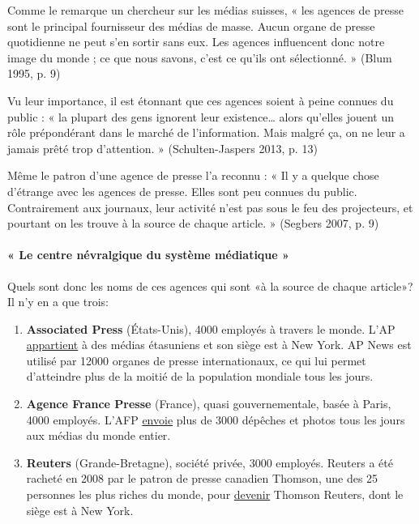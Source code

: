 Comme le remarque un chercheur sur les médias suisses, « les agences de
presse sont le principal fournisseur des médias de masse. Aucun organe
de presse quotidienne ne peut s'en sortir sans eux. Les agences
influencent donc notre image du monde ; ce que nous savons, c'est ce
qu'ils ont sélectionné. » (Blum 1995, p. 9)

Vu leur importance, il est étonnant que ces agences soient à peine
connues du public : « la plupart des gens ignorent leur
existence\ldots{} alors qu'elles jouent un rôle prépondérant dans le
marché de l'information. Mais malgré ça, on ne leur a jamais prêté trop
d'attention. » (Schulten-Jaspers 2013, p. 13)

Même le patron d'une agence de presse l'a reconnu : « Il y a quelque
chose d'étrange avec les agences de presse. Elles sont peu connues du
public. Contrairement aux journaux, leur activité n'est pas sous le feu
des projecteurs, et pourtant on les trouve à la source de chaque
article. » (Segbers 2007, p. 9)

\hypertarget{-le-centre-nuxe9vralgique-du-systuxe8me-muxe9diatique-}{%
\paragraph{« Le centre névralgique du système médiatique
»}\label{-le-centre-nuxe9vralgique-du-systuxe8me-muxe9diatique-}}

Quels sont donc les noms de ces agences qui sont «à la source de chaque
article»? Il n'y en a que trois:

\begin{enumerate}
\def\labelenumi{\arabic{enumi}.}
\tightlist
\item
  \textbf{Associated Press} (États-Unis), 4000 employés à travers le
  monde. L'AP
  \href{https://en.wikipedia.org/wiki/Associated_Press}{appartient} à
  des médias étasuniens et son siège est à New York. AP News est utilisé
  par 12000 organes de presse internationaux, ce qui lui permet
  d'atteindre plus de la moitié de la population mondiale tous les
  jours.
\item
  \textbf{Agence France Presse} (France), quasi gouvernementale, basée à
  Paris, 4000 employés. L'AFP
  \href{https://en.wikipedia.org/wiki/Agence_France-Presse}{envoie} plus
  de 3000 dépêches et photos tous les jours aux médias du monde entier.
\item
  \textbf{Reuters} (Grande-Bretagne), société privée, 3000 employés.
  Reuters a été racheté en 2008 par le patron de presse canadien
  Thomson, une des 25 personnes les plus riches du monde, pour
  \href{https://en.wikipedia.org/wiki/Reuters}{devenir} Thomson Reuters,
  dont le siège est à New York.
\end{enumerate}

